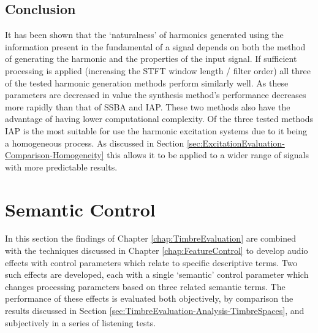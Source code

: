 
	\subsection{Conclusion}
	\label{sec:PerceptualExperiments-Reconstruction-Conclusion}
		It has been shown that the `naturalness' of harmonics generated using the information present in the
		fundamental of a signal depends on both the method of generating the harmonic and the properties of the
		input signal. If sufficient processing is applied (increasing the STFT window length / filter order) all
		three of the tested harmonic generation methods perform similarly well. As these parameters are decreased
		in value the synthesis method's performance decreases more rapidly than that of SSBA and IAP. These two
		methods also have the advantage of having lower computational complexity. Of the three tested methods IAP
		is the most suitable for use the harmonic excitation systems due to it being a homogeneous process. As
		discussed in Section \ref{sec:ExcitationEvaluation-Comparison-Homogeneity} this allows it to be applied to
		a wider range of signals with more predictable results.

\section{Semantic Control}
\label{sec:PerceptualExperiments-SemanticControl}
	In this section the findings of Chapter \ref{chap:TimbreEvaluation} are combined with the techniques discussed in
	Chapter \ref{chap:FeatureControl} to develop audio effects with control parameters which relate to specific
	descriptive terms. Two such effects are developed, each with a single `semantic' control parameter which changes
	processing parameters based on three related semantic terms. The performance of these effects is evaluated both
	objectively, by comparison the results discussed in Section \ref{sec:TimbreEvaluation-Analysis-TimbreSpaces}, and
	subjectively in a series of listening tests.

